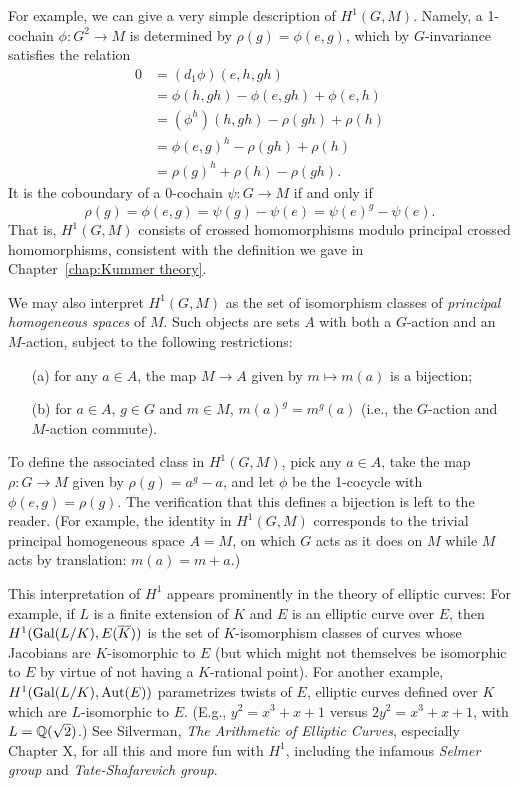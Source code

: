 
For example, we can give a very simple description of $H^1(G,M)$.
Namely, a 1-cochain $\phi: G^2 \to M$ is determined by $\rho(g) = \phi(e, g)$,
which by $G$-invariance satisfies the relation
\begin{align*}
0 &= (d_1\phi)(e, h, gh) \\
&= \phi(h, gh) - \phi(e, gh) + \phi(e, h) \\
&= (\phi^h)(h,gh) - \rho(gh) + \rho(h) \\
&= \phi(e, g)^h - \rho(gh) + \rho(h) \\
&= \rho(g)^h + \rho(h) - \rho(gh).
\end{align*}
It is the coboundary of a 0-cochain $\psi: G \to M$ if and only if
\[
\rho(g) = \phi(e,g) = \psi(g) - \psi(e) = \psi(e)^g - \psi(e).
\]
That is, $H^1(G,M)$ consists of crossed homomorphisms modulo principal
crossed homomorphisms, consistent with the definition
we gave in Chapter~\ref{chap:Kummer theory}. 

We may also interpret $H^1(G,M)$ as the set of isomorphism classes of \emph{principal homogeneous spaces} of $M$.
Such objects are sets $A$ with both a $G$-action and an $M$-action, subject to the
following restrictions:
\begin{enumerate}
\item[(a)] for any $a \in A$, the map $M \to A$ given by $m \mapsto m(a)$ is a bijection;
\item[(b)] for $a \in A$, $g \in G$ and $m \in M$, $m(a)^g = m^g(a)$ 
(i.e., the $G$-action and $M$-action commute).
\end{enumerate}
To define the associated class in $H^1(G,M)$, pick any $a \in A$, 
take the map $\rho: G \to M$ given by $\rho(g) = a^g - a$, and
let $\phi$ be the 1-cocycle with $\phi(e, g) = \rho(g)$.
The verification that this defines a bijection is left to the reader.
(For example, the identity in $H^1(G,M)$ corresponds to the trivial 
principal homogeneous space $A=M$, on which $G$ acts as it does on $M$ while $M$ acts by 
translation: $m(a) = m+a$.)

This interpretation of $H^1$ appears prominently in the theory of elliptic curves:
For example, if $L$ is a finite extension of $K$ and $E$ is an elliptic curve over
$E$, then $H^1(\operatorname{Gal}(L/K), E(\overline{K}))$ is the set of $K$-isomorphism
classes of curves whose Jacobians are $K$-isomorphic to $E$
(but which might not themselves be isomorphic to $E$ by virtue of not
having a $K$-rational point). 
For another example,  $H^1(\operatorname{Gal}(L/K), \operatorname{Aut}(E))$ parametrizes
twists of $E$, elliptic curves defined over $K$ which are $L$-isomorphic
to $E$. (E.g., $y^2 = x^3+x+1$ versus $2y^2 = x^3 + x +1$, with $L = \mathbb{Q}(\sqrt{2})$.) See Silverman,
\textit{The Arithmetic of Elliptic Curves}, especially Chapter X,
for all this and more fun with $H^1$, including the infamous \emph{Selmer group}
and \emph{Tate-Shafarevich group}.

